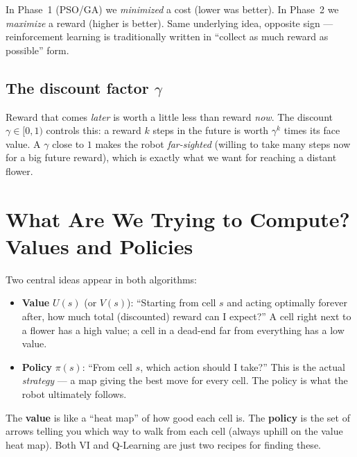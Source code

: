 \documentclass[11pt]{article}
\begin{document}
\begin{tcolorbox}[colback=yellow!8!white,colframe=orange!60!black,title=Note on convention: here, higher = better]
In Phase~1 (PSO/GA) we \emph{minimized} a cost (lower was better). In Phase~2
we \emph{maximize} a reward (higher is better). Same underlying idea, opposite
sign --- reinforcement learning is traditionally written in ``collect as much
reward as possible'' form.
\end{tcolorbox}

\subsection{The discount factor $\gamma$}
Reward that comes \emph{later} is worth a little less than reward \emph{now}.
The discount $\gamma\in[0,1)$ controls this: a reward $k$ steps in the future is
worth $\gamma^k$ times its face value. A $\gamma$ close to $1$ makes the robot
\emph{far-sighted} (willing to take many steps now for a big future reward),
which is exactly what we want for reaching a distant flower.

\section{What Are We Trying to Compute? Values and Policies}

Two central ideas appear in both algorithms:

\begin{itemize}[leftmargin=1.4em]
  \item \textbf{Value} $U(s)$ (or $V(s)$): ``Starting from cell $s$ and acting
        optimally forever after, how much total (discounted) reward can I
        expect?'' A cell right next to a flower has a high value; a cell in a
        dead-end far from everything has a low value.
  \item \textbf{Policy} $\pi(s)$: ``From cell $s$, which action should I take?''
        This is the actual \emph{strategy} --- a map giving the best move for
        every cell. The policy is what the robot ultimately follows.
\end{itemize}

\begin{intuition}
The \textbf{value} is like a ``heat map'' of how good each cell is. The
\textbf{policy} is the set of arrows telling you which way to walk from each
cell (always uphill on the value heat map). Both VI and Q-Learning are just two
recipes for finding these.
\end{intuition}
\end{document}
